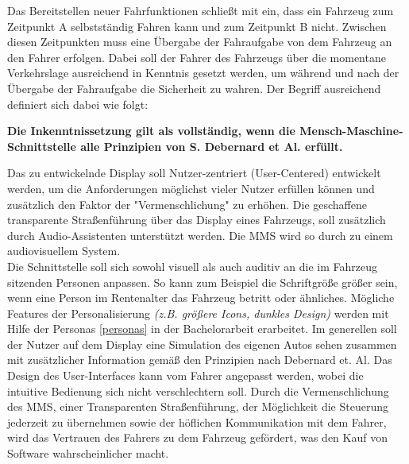 Das Bereitstellen neuer Fahrfunktionen schließt mit ein, dass ein Fahrzeug zum Zeitpunkt A selbstständig Fahren kann und zum Zeitpunkt B nicht. Zwischen diesen Zeitpunkten muss eine Übergabe der Fahraufgabe von dem Fahrzeug an den Fahrer erfolgen. Dabei soll der Fahrer des Fahrzeugs über die momentane Verkehrslage ausreichend in Kenntnis gesetzt werden, um während und nach der Übergabe der Fahraufgabe die Sicherheit zu wahren. Der Begriff ausreichend definiert sich dabei wie folgt:
\begin{center}
	\textbf{Die Inkenntnissetzung gilt als vollständig, wenn die Mensch-Maschine-Schnittstelle alle Prinzipien von S. Debernard et Al. \cite{b16} erfüllt.}\\
\end{center}
Das zu entwickelnde Display soll Nutzer-zentriert (User-Centered) entwickelt werden, um die Anforderungen möglichst vieler Nutzer erfüllen können und zusätzlich den Faktor der "Vermenschlichung" zu erhöhen. Die geschaffene transparente Straßenführung über das Display eines Fahrzeugs, soll zusätzlich durch Audio-Assistenten unterstützt werden. Die MMS wird so durch zu einem audiovisuellem System.\\
Die Schnittstelle soll sich sowohl visuell als auch auditiv an die im Fahrzeug sitzenden Personen anpassen. So kann zum Beispiel die Schriftgröße größer sein, wenn eine Person im Rentenalter das Fahrzeug betritt oder ähnliches. Mögliche Features der Personalisierung \textit{(z.B. größere Icons, dunkles Design)} werden mit Hilfe der Personas \ref{personas} in der Bachelorarbeit erarbeitet. Im generellen soll der Nutzer auf dem Display eine Simulation des eigenen Autos sehen zusammen mit zusätzlicher Information gemäß den Prinzipien nach Debernard et. Al. Das Design des User-Interfaces kann vom Fahrer angepasst werden, wobei die intuitive Bedienung sich nicht verschlechtern soll. Durch die Vermenschlichung des MMS, einer Transparenten Straßenführung, der Möglichkeit die Steuerung jederzeit zu übernehmen sowie der höflichen Kommunikation mit dem Fahrer, wird das Vertrauen des Fahrers zu dem Fahrzeug gefördert\cite{meetolli}, was den Kauf von Software wahrscheinlicher macht. 
